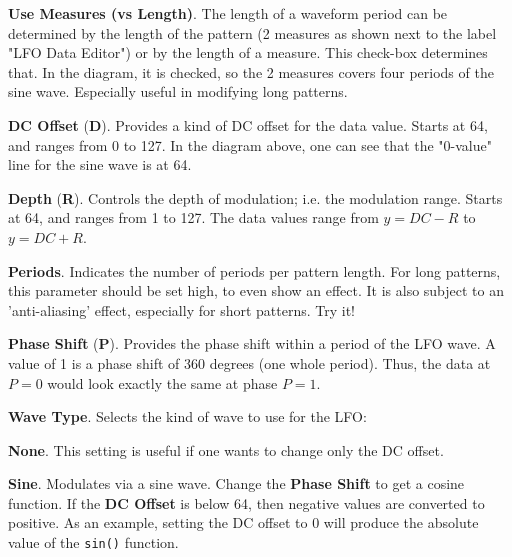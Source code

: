    \begin{enumber}
      \item \textbf{Use Measures (vs Length)}.
         The length of a waveform period can be determined by the length of the
         pattern (2 measures as shown next to the label "LFO Data Editor") or
         by the length of a measure. This check-box determines that.
         In the diagram, it is checked, so the 2 measures covers four periods
         of the sine wave.
         Especially useful in modifying long patterns.
      \item \textbf{DC Offset} (\textbf{D}).
         Provides a kind of DC offset for the data value. Starts at 64, and
         ranges from 0 to 127.
         In the diagram above, one can see that the "0-value" line for the sine
         wave is at 64.
      \item \textbf{Depth} (\textbf{R}).
         Controls the depth of modulation; i.e. the modulation range.
         Starts at 64, and ranges from 1 to 127.
         The data values range from \( y = DC - R \) to \( y = DC + R\).
      \item \textbf{Periods}.
         Indicates the number of periods per pattern length.
         For long patterns, this parameter should be set high,
         to even show an effect.  It is also subject to an 'anti-aliasing'
         effect, especially for short patterns.
         Try it!
      \item \textbf{Phase Shift} (\textbf{P}).
         Provides the phase shift within a period of the LFO wave.
         A value of 1 is a phase shift of 360 degrees (one whole period).
         Thus, the data at \( P = 0 \) would look exactly the same at phase
         \( P = 1\).
      \item \textbf{Wave Type}.
         Selects the kind of wave to use for the LFO:
         \begin{enumber}
            \item \textbf{None}.
               This setting is useful if one wants to change only the DC
               offset.
            \item \textbf{Sine}.
               Modulates via a sine wave.
               Change the \textbf{Phase Shift} to get a cosine function.
               If the \textbf{DC Offset} is below 64, then negative values are
               converted to positive. As an example, setting the DC offset to 0
               will produce the absolute value of the \texttt{sin()} function.

\end{enumber}
\end{enumber}
